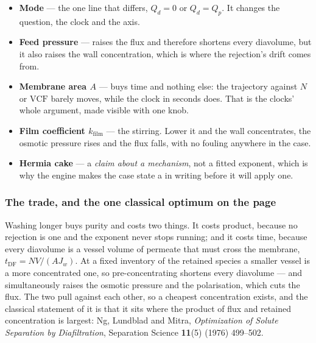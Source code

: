 \documentclass[11pt,a4paper]{article}
\begin{document}
\begin{itemize}[leftmargin=*,nosep]
  \item \textbf{Mode} --- the one line that differs, $Q_d = 0$ or
        $Q_d = Q_p$.  It changes the question, the clock and the axis.
  \item \textbf{Feed pressure} --- raises the flux and therefore shortens
        every diavolume, but it also raises the wall concentration, which
        is where the rejection's drift comes from.
  \item \textbf{Membrane area $A$} --- buys time and nothing else: the
        trajectory against $N$ or $\mathrm{VCF}$ barely moves, while the
        clock in seconds does.  That is the clocks' whole argument, made
        visible with one knob.
  \item \textbf{Film coefficient $k_{\mathrm{film}}$} --- the stirring.
        Lower it and the wall concentrates, the osmotic pressure rises and
        the flux falls, with no fouling anywhere in the case.
  \item \textbf{Hermia cake} --- a \emph{claim about a mechanism}, not a
        fitted exponent, which is why the engine makes the case state a
         in writing before it will apply one.
\end{itemize}

\subsubsection*{The trade, and the one classical optimum on the page}

Washing longer buys purity and costs two things.  It costs product,
because no rejection is one and the exponent never stops running; and it
costs time, because every diavolume is a vessel volume of permeate that
must cross the membrane, $t_{\mathrm{DF}} = N V/(A J_w)$.  At a fixed
inventory of the retained species a smaller vessel is a more concentrated
one, so pre-concentrating shortens every diavolume --- and simultaneously
raises the osmotic pressure and the polarisation, which cuts the flux.
The two pull against each other, so a cheapest concentration exists, and
the classical statement of it is that it sits where the product of flux
and retained concentration is largest: Ng, Lundblad and
Mitra, \emph{Optimization of Solute Separation by Diafiltration},
Separation Science \textbf{11}(5) (1976) 499--502.
\end{document}
